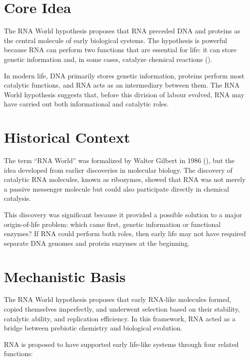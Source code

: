 \documentclass[
  oneside]{book}
\begin{document}
\section{Core Idea}\label{core-idea-1}

The RNA World hypothesis proposes that RNA preceded DNA and proteins as the central molecule of early biological systems. The hypothesis is powerful because RNA can perform two functions that are essential for life: it can store genetic information and, in some cases, catalyze chemical reactions ().

In modern life, DNA primarily stores genetic information, proteins perform most catalytic functions, and RNA acts as an intermediary between them. The RNA World hypothesis suggests that, before this division of labour evolved, RNA may have carried out both informational and catalytic roles.

\section{Historical Context}\label{historical-context-1}

The term ``RNA World'' was formalized by Walter Gilbert in 1986 (), but the idea developed from earlier discoveries in molecular biology. The discovery of catalytic RNA molecules, known as ribozymes, showed that RNA was not merely a passive messenger molecule but could also participate directly in chemical catalysis.

This discovery was significant because it provided a possible solution to a major origin-of-life problem: which came first, genetic information or functional enzymes? If RNA could perform both roles, then early life may not have required separate DNA genomes and protein enzymes at the beginning.

\section{Mechanistic Basis}\label{mechanistic-basis-1}

The RNA World hypothesis proposes that early RNA-like molecules formed, copied themselves imperfectly, and underwent selection based on their stability, catalytic ability, and replication efficiency. In this framework, RNA acted as a bridge between prebiotic chemistry and biological evolution.

RNA is proposed to have supported early life-like systems through four related functions:
\end{document}
